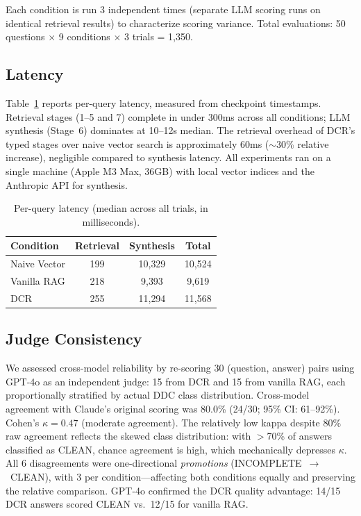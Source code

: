 \documentclass[11pt,a4paper]{article}
\begin{document}
Each condition is run 3 independent times (separate LLM scoring runs on identical retrieval results) to characterize scoring variance. Total evaluations: 50 questions $\times$ 9 conditions $\times$ 3 trials = 1,350.

\subsection{Latency}
\label{sec:latency}

Table~\ref{tab:latency} reports per-query latency, measured from checkpoint timestamps. Retrieval stages (1--5 and 7) complete in under 300ms across all conditions; LLM synthesis (Stage~6) dominates at 10--12s median. The retrieval overhead of DCR's typed stages over naive vector search is approximately 60ms ($\sim$30\% relative increase), negligible compared to synthesis latency. All experiments ran on a single machine (Apple M3 Max, 36GB) with local vector indices and the Anthropic API for synthesis.

\begin{table}[t]
\centering
\caption{Per-query latency (median across all trials, in milliseconds).}
\label{tab:latency}
\begin{tabular}{@{}lccc@{}}
\toprule
Condition & Retrieval & Synthesis & Total \\
\midrule
Naive Vector & 199 & 10{,}329 & 10{,}524 \\
Vanilla RAG & 218 & 9{,}393 & 9{,}619 \\
DCR & 255 & 11{,}294 & 11{,}568 \\
\bottomrule
\end{tabular}
\end{table}

\subsection{Judge Consistency}
\label{sec:judge}

We assessed cross-model reliability by re-scoring 30 (question, answer) pairs using GPT-4o as an independent judge: 15 from DCR and 15 from vanilla RAG, each proportionally stratified by actual DDC class distribution. Cross-model agreement with Claude's original scoring was 80.0\% (24/30; 95\% CI: 61--92\%). Cohen's $\kappa = 0.47$ (moderate agreement). The relatively low kappa despite 80\% raw agreement reflects the skewed class distribution: with $>$70\% of answers classified as CLEAN, chance agreement is high, which mechanically depresses $\kappa$. All 6 disagreements were one-directional \emph{promotions} (INCOMPLETE~$\to$~CLEAN), with 3 per condition---affecting both conditions equally and preserving the relative comparison. GPT-4o confirmed the DCR quality advantage: 14/15 DCR answers scored CLEAN vs.\ 12/15 for vanilla RAG.
\end{document}
